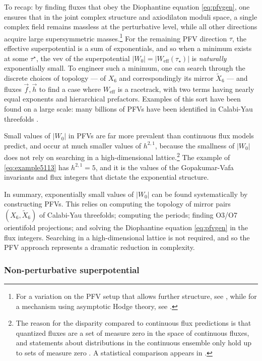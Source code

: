 \documentclass[12pt,a4wide]{article}
\begin{document}
To recap: by finding fluxes that obey the Diophantine equation \eqref{eq:pfvgen}, one ensures that 
in the joint complex structure and axiodilaton moduli space, a single complex field remains
massless at the perturbative level, while all other directions acquire large supersymmetric masses.\footnote{For a variation on the PFV setup that allows further structure, see \cite{Cicoli:2022vny}, while for a mechanism using asymptotic Hodge theory, see \cite{Bastian:2021hpc}.}
For the remaining PFV direction $\tau$, the effective superpotential is a sum of exponentials, and so when a minimum exists at some $\tau^{\star}$, the vev of the superpotential $|W_0| = |W_{\text{eff}}(\tau_\star)|$ is \emph{naturally} exponentially small.
To engineer such a minimum, one can search through the discrete choices of topology --- of $X_6$ and correspondingly its mirror $\widetilde{X}_6$ --- and fluxes $\vec{f},\vec{h}$ to find a case where $W_{\text{eff}}$ is a racetrack, with two terms having nearly equal exponents and hierarchical prefactors.  Examples of this sort have been found on a large scale: many billions of PFVs have been identified in Calabi-Yau threefolds \cite{coni}.

Small values of $|W_0|$ in PFVs are far more prevalent than continuous flux models predict, and occur at much smaller values of $h^{2,1}$, because
the smallness of $|W_0|$ 
does not rely on searching in a high-dimensional lattice.\footnote{The reason for the disparity compared to continuous flux predictions is that quantized fluxes are a set of measure zero in the space of continuous fluxes, and statements about distributions in the continuous ensemble only hold up to sets of measure zero \cite{Demirtas:2021nlu}.
A statistical comparison appears in \cite{Broeckel:2021uty}.}
The example of \eqref{eq:example5113} has $h^{2,1}=5$, and it is the values of the Gopakumar-Vafa invariants and flux integers that dictate the exponential structure.
 
In summary, exponentially small values of $|W_0|$ can be found systematically by constructing PFVs.
This relies on computing the topology of mirror pairs $(X_6,\widetilde{X}_6)$ of Calabi-Yau threefolds; computing the periods; finding O3/O7 orientifold projections; and solving the Diophantine equation \eqref{eq:pfvgen} in the flux integers.  Searching in a high-dimensional lattice is not required, and so the PFV approach represents a dramatic reduction in complexity.

\subsubsection{Non-perturbative superpotential}\label{sec:wnpkklt}
\end{document}
